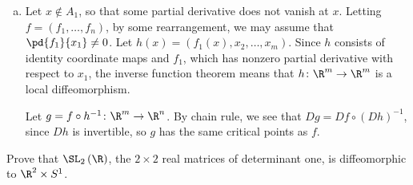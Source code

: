 \documentclass[10pt]{mypackage}
\begin{document}
\begin{solution}\hfill
  \begin{enumerate}[(a)]
    \item Let $x\notin A_1$, so that some partial derivative does not vanish at $x$. Letting $f = \left( f_1,\dots,f_n \right)$, by some rearrangement, we may assume that $ \pd{f_1}{x_1} \neq 0 $. Let $h(x) = \left( f_1(x),x_2,\dots,x_m \right)$. Since $h$ consists of identity coordinate maps and $f_1$, which has nonzero partial derivative with respect to $x_1$, the inverse function theorem means that $h\colon \R^{m}\rightarrow \R^{m}$ is a local diffeomorphism.\newline

      Let $g = f\circ h^{-1}\colon \R^{m}\rightarrow \R^n$. By chain rule, we see that $Dg = Df\circ \left( Dh \right)^{-1}$, since $Dh$ is invertible, so $g$ has the same critical points as $f$. 
  \end{enumerate}
\end{solution}
\begin{problem}[Problem 5]
  Prove that $\SL_2\left( \R \right)$, the $2\times 2$ real matrices of determinant one, is diffeomorphic to $\R^{2}\times S^{1}$.
\end{problem}
\end{document}
